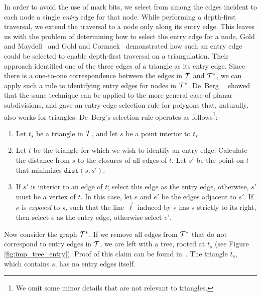{  In order to avoid the use of mark bits, we select from among the edges incident 
  to each node a single \emph{entry} edge for that node. 
  While performing a depth-first traversal, we extend the traversal 
  to a node only along its entry edge.
  This leaves us with the problem of determining how to select the entry edge
  for a node.  
  Gold and Maydell~\cite{gold_maydell_1978} and Gold and 
  Cormack~\cite{gold_cormack86} demonstrated how such an entry edge could 
  be selected to enable depth-first traversal on a triangulation.
  Their approach identified one of the three edges of a triangle as its 
  entry edge.
  Since there is a one-to-one correspondence between the edges in $\mathcal{T}$ 
  and $\mathcal{T}^*$, we can apply such a rule to identifying entry
  edges for nodes in $\mathcal{T}^*$. 
  De~Berg~\etal~\cite{deberg_et_al_1997} showed that the same technique can 
  be applied to the more general case of planar subdivisions, and 
  gave an entry-edge selection rule for polygons that, naturally, also works 
  for triangles.
  De~Berg's selection rule operates as follows\footnote{We 
  omit some minor details that are not relevant to triangles.}:

  \begin{enumerate}
  \item Let $t_s$ be a triangle in $\mathcal{T}$, and let $s$ be a point interior
  to $t_s$.
  \item Let $t$ be the triangle for which we wish to identify an entry edge.
  Calculate the distance from $s$ to the closures of all edges of $t$.
  Let $s'$ be the point on $t$ that minimizes $\texttt{dist}(s,s')$. 
  \item If $s'$ is interior to an edge of $t$; select this edge as the
  entry edge, otherwise, $s'$ must be a vertex of $t$. 
  In this case, let $e$ and $e'$ be the edges adjacent to $s'$. 
  If $e$ is \emph{exposed} to $s$, such that the line $\vec{\ell}$ induced by 
  $e$ has $s$ strictly to its right, then select $e$ as the entry edge, otherwise
  select $e'$. 
  \end{enumerate}

  Now consider the graph $\mathcal{T}^*$.
  If we remove all edges from $\mathcal{T}^*$ that
  do not correspond to entry edges in $\mathcal{T}$, we are left with a tree, 
  rooted at $t_s$ (see Figure \ref{fig:imp_tree_entry}).
  Proof of this claim can be found in~\cite{deberg_et_al_1997}.
  The triangle $t_s$, which contains $s$, has no entry edges itself.

}
